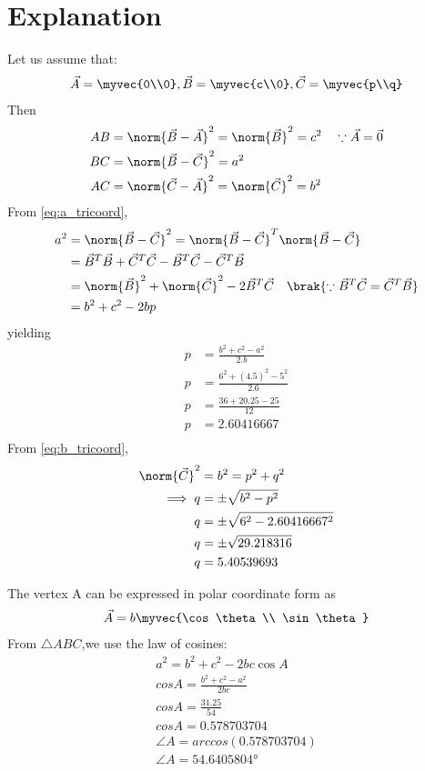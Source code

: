\documentclass[journal,12pt,twocolumn]{IEEEtran}
\begin{document}
\section{Explanation}
Let us assume that:
\begin{align}
\label{eq:tri_basic}
\vec{A} = \myvec{0\\0}, \vec{B} = \myvec{c\\0}, \vec{C} = \myvec{p\\q}
\end{align}
%
Then
\begin{align}
\label{eq:c_tricoord}
AB &= \norm{\vec{B}-\vec{A}}^2 = \norm{\vec{B}}^2  = c^2 \quad \because \vec{A} = \vec{0}
\\
\label{eq:a_tricoord}
BC &= \norm{\vec{B}-\vec{C}}^2  = a^2
\\
AC &= \norm{\vec{C}-\vec{A}}^2 =  \norm{\vec{C}}^2 =  b^2
\label{eq:b_tricoord}
\end{align}
%
From \eqref{eq:a_tricoord},
\begin{align}
a^2 &=\norm{\vec{B}-\vec{C}}^2 = \norm{\vec{B}-\vec{C}}^T\norm{\vec{B}-\vec{C}}  
\\
&= \vec{B}^T\vec{B}+\vec{C}^T\vec{C}-\vec{B}^T\vec{C} - \vec{C}^T\vec{B} 
\\
&= \norm{\vec{B}}^2 + \norm{\vec{C}}^2 - 2\vec{B}^T\vec{C} \quad \brak{\because \vec{B}^T\vec{C} = \vec{C}^T\vec{B} } 
\label{eq:tri_const_norm_ac}
\\
&= b^2+c^2-2bp
\end{align}
%
yielding
\begin{align}
p&= \frac{b^2+c^2-a^2}{2.b}
\\
p&= \frac{6^2+(4.5)^2-5^2}{2.6}
\\
p&= \frac{36+20.25-25}{12}
\\
p&= 2.60416667
\\
\end{align}
%
From \eqref{eq:b_tricoord}, 
\begin{align}
\norm{\vec{C}}^2 &=b^2 = p^2+q^2
\\
\implies q&= \pm \sqrt{b^2-p^2}
\\
q&= \pm \sqrt{6^2-2.60416667^2}
\\
q&= \pm \sqrt{29.218316}
\\
q&= 5.40539693
\end{align}

The vertex A can be expressed in polar coordinate form as 
\begin {align}
\vec{A} = b\myvec{\cos \theta\\ \sin \theta}
\end{align}
From $\triangle ABC$,we use the law of cosines:
\begin{align}
a^2 = b^2+c^2-2bc \cos A
\\
cos A = \frac{b^2+c^2-a^2}{2bc}
\\
cos A = \frac{31.25}{54}
\\
cos A = 0.578703704
\\
\angle{A} = arccos(0.578703704)
\\
\angle{A} = 54.6405804°
\end{align}
\end{document}
